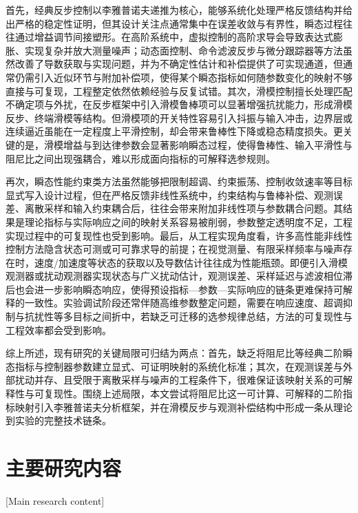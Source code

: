 首先，经典反步控制以李雅普诺夫递推为核心，能够系统化处理严格反馈结构并给出严格的稳定性证明，但其设计关注点通常集中在误差收敛与有界性，瞬态过程往往通过增益调节间接塑形。在高阶系统中，虚拟控制的高阶求导会导致表达式膨胀、实现复杂并放大测量噪声；动态面控制、命令滤波反步与微分跟踪器等方法虽然改善了导数获取与实现问题，并为不确定性估计和补偿提供了可实现通道，但通常仍需引入近似环节与附加补偿项，使得某个瞬态指标如何随参数变化的映射不够直接与可复现，工程整定依然依赖经验与反复试错\cite{ref1,ref2,ref3,ref5,ref6,ref7,ref76,ref77,ref78,ref82}。其次，滑模控制擅长处理匹配不确定项与外扰，在反步框架中引入滑模鲁棒项可以显著增强抗扰能力，形成滑模反步、终端滑模等结构\cite{ref8,ref9,ref10,ref11,ref12,ref18,ref80,ref81}。但滑模项的开关特性容易引入抖振与输入冲击，边界层或连续逼近虽能在一定程度上平滑控制，却会带来鲁棒性下降或稳态精度损失\cite{ref48,ref49}。更关键的是，滑模增益与到达律参数会显著影响瞬态过程，使得鲁棒性、输入平滑性与阻尼比之间出现强耦合，难以形成面向指标的可解释选参规则。

再次，瞬态性能约束类方法虽然能够把限制超调、约束振荡、控制收敛速率等目标显式写入设计过程，但在严格反馈非线性系统中，约束结构与鲁棒补偿、观测误差、离散采样和输入约束耦合后，往往会带来附加非线性项与参数耦合问题。其结果是理论指标与实际响应之间的映射关系容易被削弱，参数整定透明度不足，工程实现过程中的可复现性也受到影响\cite{ref57,ref64,ref65,ref66,ref79}。最后，从工程实现角度看，许多高性能非线性控制方法隐含状态可测或可可靠求导的前提；在视觉测量、有限采样频率与噪声存在时，速度/加速度等状态的获取以及导数估计往往成为性能瓶颈。即便引入滑模观测器或扰动观测器实现状态与广义扰动估计，观测误差、采样延迟与滤波相位滞后也会进一步影响瞬态响应，使得预设指标—参数—实际响应的链条更难保持可解释的一致性\cite{ref29,ref30,ref31,ref46,ref24,ref51,ref36,ref32,ref33,ref34,ref35,ref52,ref53,ref54,ref55,ref56,ref77,ref81,ref82}。实验调试阶段还常伴随高维参数整定问题，需要在响应速度、超调抑制与抗扰性等多目标之间折中，若缺乏可迁移的选参规律总结，方法的可复现性与工程效率都会受到影响。

综上所述，现有研究的关键局限可归结为两点：首先，缺乏将阻尼比等经典二阶瞬态指标与控制器参数建立显式、可证明映射的系统化标准；其次，在观测误差与外部扰动并存、且受限于离散采样与噪声的工程条件下，很难保证该映射关系的可解释性与可复现性。围绕上述局限，本文尝试将阻尼比这一可计算、可解释的二阶指标映射引入李雅普诺夫分析框架，并在滑模反步与观测补偿结构中形成一条从理论到实验的完整技术链条\cite{ref57,ref64,ref65,ref66,ref79}。


\section{主要研究内容}[Main research content]

